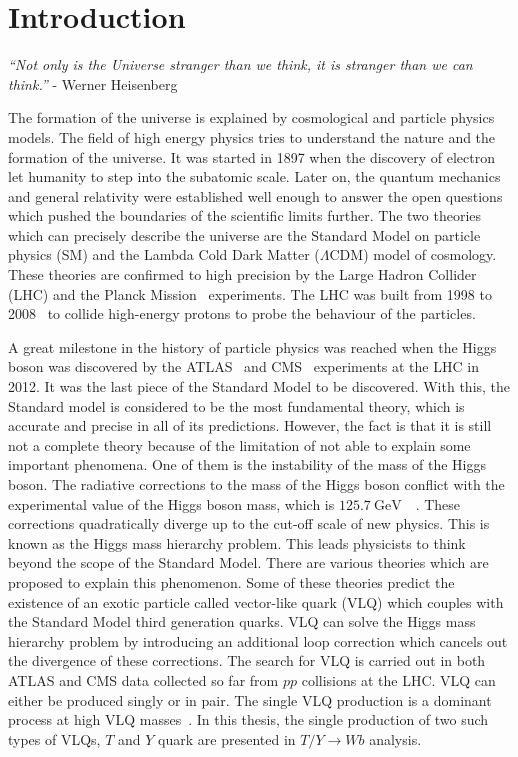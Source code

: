 
\chapter{Introduction}
\label{sec:intro}
\textit{“Not only is the Universe stranger than we think, it is stranger than we can think.”} - Werner Heisenberg

\vspace{0.5cm}
The formation of the universe is explained by cosmological and particle physics models. The field of high energy physics tries to understand the nature and the formation of the universe. It was started in 1897 when the discovery of electron~\cite{electron} let humanity to step into the subatomic scale. Later on, the quantum mechanics and general relativity were established well enough to answer the open questions which pushed the boundaries of the scientific limits further. The two theories which can precisely describe the universe are the Standard Model on particle physics (SM) and the Lambda Cold Dark Matter ($\Lambda$CDM) model of cosmology. These theories are confirmed to high precision by the Large Hadron Collider (LHC) and the Planck Mission~\cite{planck} experiments. The LHC was built from 1998 to 2008~\cite{lhc} to collide high-energy protons to probe the behaviour of the particles.

A great milestone in the history of particle physics was reached when the Higgs boson was discovered by the ATLAS~\cite{higgsatlas} and CMS~\cite{higgscms} experiments at the LHC in 2012. It was the last piece of the Standard Model to be discovered. With this, the Standard model is considered to be the most fundamental theory, which is accurate and precise in all of its predictions. However, the fact is that it is still not a complete theory because of the limitation of not able to explain some important phenomena. One of them is the instability of the mass of the Higgs boson. The radiative corrections to the mass of the Higgs boson conflict with the experimental value of the Higgs boson mass, which is $\SI{125.7}{\giga\electronvolt}$~\cite{higgsatlas}~\cite{higgscms}. These corrections quadratically diverge up to the cut-off scale of new physics. This is known as the Higgs mass hierarchy problem. This leads physicists to think beyond the scope of the Standard Model. There are various theories which are proposed to explain this phenomenon. Some of these theories predict the existence of an exotic particle called vector-like quark (VLQ) which couples with the Standard Model third generation quarks. VLQ can solve the Higgs mass hierarchy problem by introducing an additional loop correction which cancels out the divergence of these corrections. The search for VLQ is carried out in both ATLAS and CMS data collected so far from $pp$ collisions at the LHC. VLQ can either be produced singly or in pair. The single VLQ production is a dominant process at high VLQ masses~\cite{wulzer}. In this thesis, the single production of two such types of VLQs, $T$ and $Y$ quark are presented in $T/Y\rightarrow Wb$ analysis.

